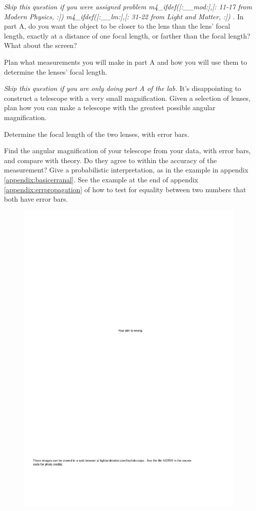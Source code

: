 \prelabquestion    \emph{Skip this question if you were assigned problem
m4_ifdef([:__mod:],[:%
11-17 from Modern Physics,%
:])%
m4_ifdef([:__lm:],[:%
31-22 from Light and Matter,%
:])%
.} 
In part A, do you want the object to be closer to the
lens than the lens' focal length, exactly at a distance of
one focal length, or farther than the focal length?
What about the screen?

\prelabquestion  Plan what measurements you will make in part A and how
you will use them to determine the lenses' focal length.

\prelabquestion  \emph{Skip this question if you are only doing part A of the lab.}
It's disappointing to construct a telescope with
a very small magnification. Given a selection of lenses, plan
how you can make a telescope with the greatest possible
angular magnification.

\analysis

Determine the focal length of the two lenses, with error bars.

Find the angular magnification of your telescope from your
data, with error bars, and compare with theory. Do they
agree to within the accuracy of the measurement?
Give a probabilistic interpretation, as in the example
in appendix \ref{appendix:basicerranal}.
See the example at the end of appendix \ref{appendix:errpropagation} of how to
test for equality between two numbers that both have error bars.

\pagebreak

\begin{figure}
  \includegraphics{../figs/op-geo-terrier}\label{fig:telescope-terrier}
\end{figure}
